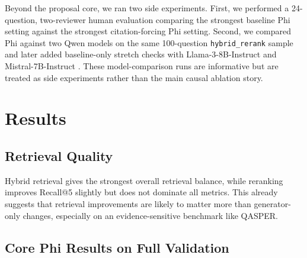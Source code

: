 \documentclass[11pt]{article}
\begin{document}
Beyond the proposal core, we ran two side experiments. First, we performed a 24-question, two-reviewer human evaluation comparing the strongest baseline Phi setting against the strongest citation-forcing Phi setting. Second, we compared Phi against two Qwen models on the same 100-question \texttt{hybrid\_rerank} sample and later added baseline-only stretch checks with Llama-3-8B-Instruct \citep{dubey2024llama3} and Mistral-7B-Instruct \citep{mistral2024mistral7binstructv03}. These model-comparison runs are informative but are treated as side experiments rather than the main causal ablation story.

\section{Results}

\subsection{Retrieval Quality}

\begin{table}[H]
\centering
\small
{}
\caption{Validation retrieval results on section-aware chunks.}
\label{tab:retrieval}
\end{table}

Hybrid retrieval gives the strongest overall retrieval balance, while reranking improves Recall@5 slightly but does not dominate all metrics. This already suggests that retrieval improvements are likely to matter more than generator-only changes, especially on an evidence-sensitive benchmark like QASPER.

\subsection{Core Phi Results on Full Validation}
\end{document}
